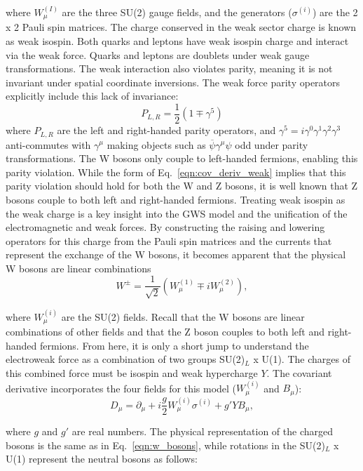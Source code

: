 \noindent where $W_{\mu}^{(I)}$ are the three SU(2) gauge fields, and the generators ($\sigma^{(i)}$) are the 2 x 2 Pauli spin matrices. The charge conserved in the weak sector charge is known as weak isospin. Both quarks and leptons have weak isospin charge and interact via the weak force. Quarks and leptons are doublets under weak gauge transformations. The weak interaction also violates parity, meaning it is not invariant under spatial coordinate inversions. 
The weak force parity operators explicitly include this lack of invariance:
\begin{equation}
    P_{L,R} = \frac{1}{2}(1 \mp \gamma^5)
\end{equation}
where $P_{L,R}$ are the left and right-handed parity operators, and $\gamma^5 = i\gamma^0\gamma^1\gamma^2\gamma^3$ anti-commutes with $\gamma^\mu$ making objects such as $\overline{\psi}\gamma^{\mu}\psi$ odd under parity transformations. The W bosons only couple to left-handed fermions, enabling this parity violation. While the form of Eq.~\ref{eqn:cov_deriv_weak} implies that this parity violation should hold for both the W and Z bosons, it is well known that Z bosons couple to both left and right-handed fermions. Treating weak isospin as the weak charge is a key insight into the GWS model and the unification of the electromagnetic and weak forces. By constructing the raising and lowering operators for this charge from the Pauli spin matrices and the currents that represent the exchange of the W bosons, it becomes apparent that the physical W bosons are linear combinations
\begin{equation}
    W^{\pm} = \frac{1}{\sqrt{2}} ( W_{\mu}^{(1)} \mp i W_{\mu}^{(2)}),
    \label{eqn:w_bosons}
\end{equation}

\noindent where $W_{\mu}^{(i)}$ are the SU(2) fields. Recall that the W bosons are linear combinations of other fields and that the Z boson couples to both left and right-handed fermions. From here, it is only a short jump to understand the electroweak force as a combination of two groups SU(2)$_L$ x U(1). The charges of this combined force must be isospin and weak hypercharge $Y$. The covariant derivative incorporates the four fields for this model ($W_\mu^{(i)}$ and $B_\mu$):
\begin{equation}
    D_\mu = \partial_\mu + i \frac{g}{2} W_{\mu}^{(i)}\sigma^{(i)} + g' Y B_\mu,
    \label{eqn:cov_deriv_ew}
\end{equation}

\noindent where $g$ and $g'$ are real numbers. The physical representation of the charged bosons is the same as in Eq.~\ref{eqn:w_bosons}, while rotations in the SU(2)$_L$ x U(1) represent the neutral bosons as follows:

